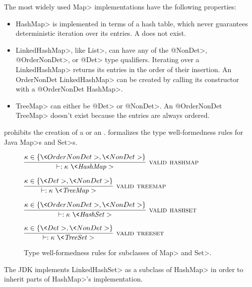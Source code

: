 The most widely used \<Map> implementations have the following properties:
\begin{itemize}
    \item \<HashMap> is implemented in terms of a hash table, which never
      guarantees deterministic iteration over its entries. A  does not exist.
    \item \<LinkedHashMap>, like \<List>, can have any of the \<@NonDet>,
      \<@OrderNonDet>, or \<@Det> type qualifiers. Iterating over a
      \<LinkedHashMap> returns
    its entries in the order of their insertion. An \<OrderNonDet
    LinkedHashMap> can be created by calling its constructor with a
    \<@OrderNonDet HashMap>.
    \item \<TreeMap> can either be \<@Det> or \<@NonDet>. An \<@OrderNonDet
      TreeMap> doesn't exist because the entries are always ordered.
\end{itemize}

\TheDeterminismChecker prohibits the creation of a  or an .
 formalizes the type well-formedness rules for
Java \<Map>s and \<Set>s.

\begin{figure}
    $\infer[\rulename{valid hashmap}]{\vdash: \|\kappa\ \<HashMap>|}{\kappa \in \{ \<OrderNonDet>, \<NonDet> \}}$
    
    \bigskip
    
    $\infer[\rulename{valid treemap}]{\vdash: \|\kappa\ \<TreeMap>|}{\kappa \in \{ \<Det>, \<NonDet> \}}$
    
    \bigskip
    
    $\infer[\rulename{valid hashset}]{\vdash: \|\kappa\ \<HashSet>|}{\kappa \in \{ \<OrderNonDet>, \<NonDet> \}}$
    
    \bigskip
    
    $\infer[\rulename{valid treeset}]{\vdash: \|\kappa\ \<TreeSet>|}{\kappa \in \{ \<Det>, \<NonDet> \}}$
    \caption{Type well-formedness rules for subclasses of \<Map> and \<Set>.}
    \label{fig-creation-rules}
\end{figure}

The JDK implements \<LinkedHashSet> as a subclass of \<HashMap>
in order to inherit parts of \<HashMap>'s implementation.


